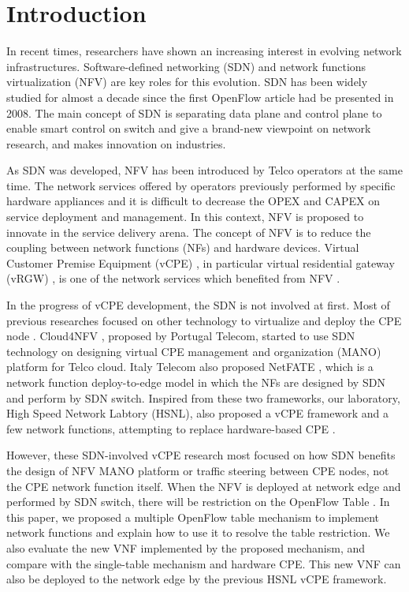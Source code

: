 \chapter{Introduction}
In recent times, researchers have shown an increasing interest in evolving network infrastructures. Software-defined networking (SDN) and network functions virtualization (NFV) are key roles for this evolution. SDN \cite{sdn-mckeown-2009-talk, sdn-newnorm, sdn-road, sdn-compre-survey} has been widely studied for almost a decade since the first OpenFlow \cite{openflow-mckeown-2008, openflow-spec} article had be presented in 2008. The main concept of SDN is separating data plane and control plane to enable smart control on switch and give a brand-new viewpoint on network research, and makes innovation on industries.

As SDN was developed, NFV \cite{nfv-wp, etsi-nfv-archi, nfv-survey} has been introduced by Telco operators at the same time. The network services offered by operators previously performed by specific hardware appliances and it is difficult to decrease the OPEX and CAPEX on service deployment and management. In this context, NFV is proposed to innovate in the service delivery arena. The concept of NFV is to reduce the coupling between network functions (NFs) and hardware devices. Virtual Customer Premise Equipment (vCPE) \cite{nec-vcpe, vcpe-enhance}, in particular virtual residential gateway (vRGW) \cite{nfv-home}, is one of the network services which benefited from NFV \cite{etsi-nfv-usecase}.

In the progress of vCPE development, the SDN is not involved at first. Most of previous researches focused on other technology to virtualize and deploy the CPE node \cite{virtual-rg, security-vgw, design-vrgw, nfv-hgw-surrogate, linux-cpe, nfv-resoure-contrain-cpe}.
Cloud4NFV \cite{cloud4nfv, cloud4nfv-telco}, proposed by Portugal Telecom, started to use SDN technology on designing virtual CPE management and organization (MANO) platform for Telco cloud. Italy Telecom also proposed NetFATE \cite{netfate}, which is a network function deploy-to-edge model in which the NFs are designed by SDN and perform by SDN switch. Inspired from these two frameworks, our laboratory, High Speed Network Labtory (HSNL), also proposed a vCPE framework and a few network functions, attempting to replace hardware-based CPE \cite{che-wei-master, che-wei-umedia}.

However, these SDN-involved vCPE research most focused on how SDN benefits the design of NFV MANO \cite{etsi-nfv-mano, etsi-nfv-mano-sdn} platform or traffic steering between CPE nodes, not the CPE network function itself. When the NFV is deployed at network edge and performed by SDN switch, there will be restriction on the OpenFlow Table \cite{multiple-flow-table}. In this paper, we proposed a multiple OpenFlow table mechanism to implement network functions and explain how to use it to resolve the table restriction. We also evaluate the new VNF implemented by the proposed mechanism, and compare with the single-table mechanism and hardware CPE. This new VNF can also be deployed to the network edge by the previous HSNL vCPE framework.

